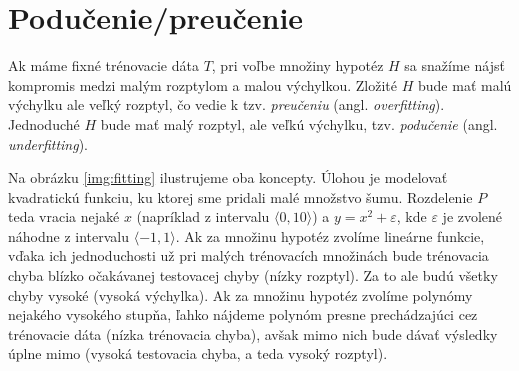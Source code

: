 




\section{Podučenie/preučenie}

Ak máme fixné trénovacie dáta $T$, pri voľbe množiny hypotéz $H$ sa snažíme
nájsť kompromis medzi malým rozptylom a malou výchylkou. Zložité $H$
bude mať malú výchylku ale veľký rozptyl, čo vedie k tzv. \emph{preučeniu}
(angl. \emph{overfitting}). Jednoduché $H$ bude mať malý rozptyl, ale
veľkú výchylku, tzv. \emph{podučenie} (angl. \emph{underfitting}).

Na obrázku \ref{img:fitting} ilustrujeme oba koncepty. Úlohou je modelovať
kvadratickú funkciu, ku ktorej sme pridali malé množstvo šumu. Rozdelenie
$P$ teda vracia nejaké $x$ (napríklad z intervalu $\langle 0, 10 \rangle$)
a $y = x^2 + \varepsilon$, kde $\varepsilon$ je zvolené náhodne z intervalu
$\langle -1, 1 \rangle$. Ak za množinu hypotéz zvolíme lineárne funkcie,
vďaka ich jednoduchosti už pri malých trénovacích množinách bude trénovacia
chyba blízko očakávanej testovacej chyby (nízky rozptyl). Za to ale budú
všetky chyby vysoké (vysoká výchylka). Ak za množinu hypotéz zvolíme polynómy
nejakého vysokého stupňa, ľahko nájdeme polynóm presne prechádzajúci cez trénovacie
dáta (nízka trénovacia chyba), avšak mimo nich bude dávať výsledky úplne mimo
(vysoká testovacia chyba, a teda vysoký rozptyl).

